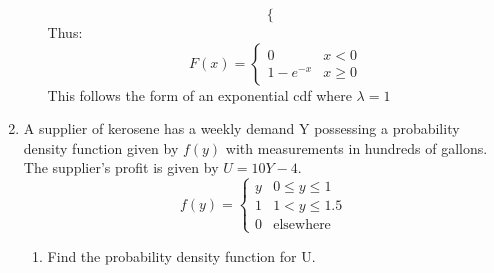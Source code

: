 \documentclass{article}
\begin{document}
\begin{enumerate}
\begin{enumerate}
\[\begin{cases}
        \end{cases}
        \]
        Thus:
        \[ F(x)=
        \begin{cases}
            0 & x < 0\\
            1-e^{-x} & x \geq 0
        \end{cases}
        \]
        This follows the form of an exponential cdf where $\lambda=1$
    \end{enumerate}
\pagebreak
    \item A supplier of kerosene has a weekly demand Y possessing a probability density function given by $f(y)$ with measurements in hundreds of gallons. The supplier's profit is given by $U = 10Y - 4$.
    \[
    f(y)=
    \begin{cases}
        y & 0 \leq y \leq 1 \\
        1 & 1 < y \leq 1.5 \\
        0 & \text{elsewhere}
    \end{cases}
    \]
    \begin{enumerate}
        \item Find the probability density function for U.
    

\end{enumerate}
\end{enumerate}
\end{document}
